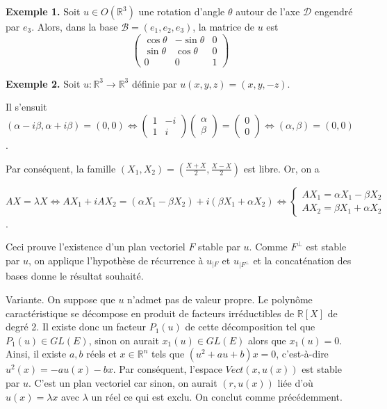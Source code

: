 \textbf{Exemple 1.} Soit $u \in O(\mathbb{R}^3)$ une rotation d'angle $\theta$ autour de l'axe $\mathcal{D}$ engendré par $e_3$. Alors, dans la base $\mathcal{B} = (e_1, e_2, e_3)$, la matrice de $u$ est
\[ \begin{pmatrix} \cos \theta & -\sin \theta & 0 \\ \sin \theta & \cos \theta & 0 \\ 0 & 0 & 1 \end{pmatrix} \]

\textbf{Exemple 2.} Soit $u : \mathbb{R}^3 \to \mathbb{R}^3$ définie par $u(x, y, z) = (x, y, -z)$.


Il s'ensuit $(\alpha - i\beta, \alpha + i\beta) = (0,0) \Leftrightarrow \begin{pmatrix} 1 & -i \\ 1 & i \end{pmatrix} \begin{pmatrix} \alpha \\ \beta \end{pmatrix} = \begin{pmatrix} 0 \\ 0 \end{pmatrix} \Leftrightarrow (\alpha, \beta) = (0,0)$.

Par conséquent, la famille $(X_1, X_2) = \left( \frac{X+X}{2}, \frac{X-X}{2} \right)$ est libre. Or, on a

$AX = \lambda X \Leftrightarrow AX_1 + iAX_2 = (\alpha X_1 - \beta X_2) + i(\beta X_1 + \alpha X_2) \Leftrightarrow \begin{cases} AX_1 = \alpha X_1 - \beta X_2 \\ AX_2 = \beta X_1 + \alpha X_2 \end{cases}$.

Ceci prouve l'existence d'un plan vectoriel $F$ stable par $u$. Comme $F^{\perp}$ est stable par $u$, on applique l'hypothèse de récurrence à $u_{|F}$ et $u_{|F^{\perp}}$ et la concaténation des bases donne le résultat souhaité.

Variante. On suppose que $u$ n'admet pas de valeur propre. Le polynôme caractéristique se décompose en produit de facteurs irréductibles de $\mathbb{R}[X]$ de degré 2. Il existe donc un facteur $P_1(u)$ de cette décomposition tel que $P_1(u) \in GL(E)$, sinon on aurait $x_1(u) \in GL(E)$ alors que $x_1(u) = 0$. Ainsi, il existe $a, b$ réels et $x \in \mathbb{R}^n$ tels que $(u^2 + au + b)x = 0$, c'est-à-dire $u^2(x) = -au(x) - bx$. Par conséquent, l'espace $Vect(x, u(x))$ est stable par $u$. C'est un plan vectoriel car sinon, on aurait $(r, u(x))$ liée d'où $u(x) = \lambda x$ avec $\lambda$ un réel ce qui est exclu. On conclut comme précédemment.

